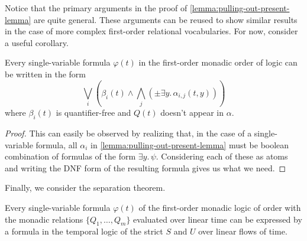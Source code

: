 \documentclass[a4paper,UKenglish,cleveref, autoref, thm-restate, numberwithinsect]{lipics-v2021}
\begin{document}
Notice that the primary arguments in the proof of \cref{lemma:pulling-out-present-lemma} are quite general. These arguments can be reused to show similar results in the case of more complex first-order relational vocabularies. For now, consider a useful corollary.
\begin{corollary}
    \label{corollary:separate-present-form-fomlo}
    Every single-variable formula $\varphi(t)$ in the first-order monadic order of logic can be written in the form
    \begin{equation*}
        \bigvee_i \left( \beta_i(t) \land \bigwedge_j \left( \pm \exists y.\, \alpha_{i, j}\left(t, y\right) \right) \right)
    \end{equation*}
    where $\beta_i(t)$ is quantifier-free and $Q(t)$ doesn't appear in $\alpha$.
\end{corollary}
\begin{proof}
    This can easily be observed by realizing that, in the case of a single-variable formula, all $\alpha_i$ in \cref{lemma:pulling-out-present-lemma} must be boolean combination of formulas of the form $\exists y.\, \psi$. Considering each of these as atoms and writing the DNF form of the resulting formula gives us what we need.
\end{proof}
Finally, we consider the separation theorem.
\begin{theorem}
    \label{theorem:separation-theorem-linear-time}
    Every single-variable formula $\varphi(t)$ of the first-order monadic logic of order with the monadic relations $\{Q_1, \ldots, Q_m\}$ evaluated over linear time can be expressed by a formula in the temporal logic of the strict $S$ and $U$ over linear flows of time.
\end{theorem}
\end{document}
